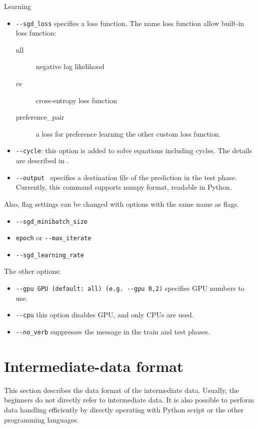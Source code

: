 \documentclass[a4paper]{report}
\begin{document}
Learning
\begin{itemize}
	\item \verb|--sgd_loss| specifies a loss function. The name loss function allow built-in loss function: 
	\begin{description}
		\item [nll] negative log likelihood
		\item [ce] cross-entropy loss function
		\item [preference\_pair] a loss for preference learning
		the other custom loss function.
	\end{description}
	\item \verb|--cycle|: this option is added to solve equations including cycles. The details are described in .
	\item \verb|--output | specifies a destination file of the prediction in the test phase. Currently, this command supports  numpy format, readable in Python.
\end{itemize}

Also, flag settings can be changed with options with the same name as flags.
\begin{itemize}
	\item \verb|--sgd_minibatch_size| 
	\item \verb|epoch| or \verb|--max_iterate|
	\item \verb|--sgd_learning_rate|
\end{itemize}

The other options:
\begin{itemize}
	\item \verb|--gpu GPU (default: all) (e.g. --gpu 0,2)|
	specifies GPU numbers to use.
	\item \verb|--cpu|
	this option disables GPU, and only CPUs are used.
	\item \verb|--no_verb| suppresses the message in the train and test phases.
\end{itemize}






\section{Intermediate-data format}
\label{sec:intermediate_data}

This section describes the data format of the intermediate data.
Usually, the beginners do not directly refer to intermediate data.
It is also possible to perform data handling efficiently by directly operating with Python script or the other programming languages.
\end{document}
